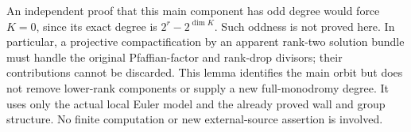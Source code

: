 \begin{remark}
\label{rem:DE-Lang-main-orbit-scope}
An independent proof that this main component has odd degree would
force \(K=0\), since its exact degree is
\(2^r-2^{\dim K}\). Such oddness is not proved here. In particular,
a projective compactification by an apparent rank-two solution bundle
must handle the original Pfaffian-factor and rank-drop divisors;
their contributions cannot be discarded. This lemma identifies the
main orbit but does not remove lower-rank components or supply a
new full-monodromy degree. It uses only the actual local Euler model
and the already proved wall and group structure. No finite computation
or new external-source assertion is involved.
\end{remark}
